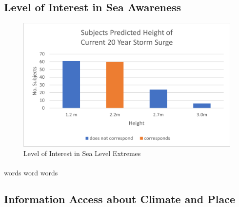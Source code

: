 \subsection{Level of Interest in Sea Awareness}

\begin{figure}[h]
    \centering
    \includegraphics{fig_results/2022-20yrss-answer.png}
    \caption{Level of Interest in Sea Level Extremes}
    \label{fig:my_label}
\end{figure}
\paragraph{}
words word words



\subsection{Information Access about Climate and Place}

